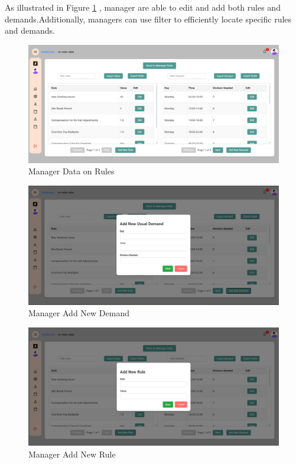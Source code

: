 \documentclass[a4paper,12pt, oneside]{report}
\begin{document}
\begin{itemize}
    As illustrated in Figure \ref{fig:manager-rules-data} , manager are able to edit and add both rules and demands.Additionally, managers can use filter to efficiently locate specific rules and demands.
    \begin{figure}[H]
    \centering
    \includegraphics[width=0.8\columnwidth]{ManagerPages/ManagerRulesData.png}
    \caption{Manager Data on Rules}
    \label{fig:manager-rules-data}
    \end{figure}
    
    \begin{figure}[H]
    \centering
    \includegraphics[width=0.8\columnwidth]{ManagerPages/ManagerRulesData2.png}
    \caption{Manager Add New Demand}
    \label{fig:manager-new-demand}
    \end{figure}

    \begin{figure}[H]
    \centering
    \includegraphics[width=0.8\columnwidth]{ManagerPages/ManagerRulesData3.png}
    \caption{Manager Add New Rule}
    \label{fig:manager-new-rules}
    \end{figure}


\end{itemize}
\end{document}
